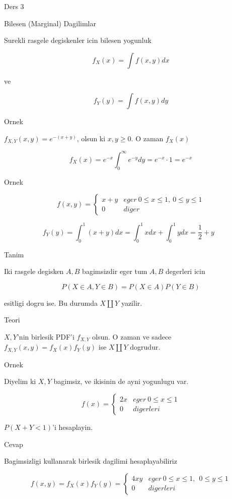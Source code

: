 \documentclass[12pt,fleqn]{article}\usepackage{../common}
\begin{document}
Ders 3

Bilesen (Marginal) Dagilimlar 

Surekli rasgele degiskenler icin bilesen yogunluk 

\[ f_X(x) = \int f(x,y) dx \]

ve

\[ f_Y(y) = \int f(x,y) dy \]

Ornek 

$f_{X,Y}(x,y) = e^{ -(x+y)}$, olsun ki $x,y \ge 0$. O zaman $f_X(x)$

\[ f_X(x) = e^{ -x} \int _{ 0}^{\infty} e^{ -y}dy = e^{ -x}  \cdot 1  = e^{-x} 
\]

Ornek 

\[ f(x,y) = 
\left\{ \begin{array}{ll}
x+y & eger \ 0 \le x \le 1, \ 0 \le y \le 1 \\
0 & diger
\end{array} \right.
 \]

\[ f_Y(y) = \int _{0}^{1}(x+y) dx = 
\int _{0}^{1}x dx + \int _{0}^{1}y dx  = 
\frac{ 1}{2} + y 
\ \ \ \label{1}
 \]

Tanim 

Iki rasgele degisken $A,B$ bagimsizdir eger tum $A,B$ degerleri icin 

\[ P(X \in A, Y \in B) = P(X \in A)P(Y \in B) \]

esitligi dogru ise. Bu durumda $X \amalg Y$ yazilir.

Teori 

$X,Y$'nin birlesik PDF'i $f_{X,Y}$ olsun. O zaman ve sadece 
$f_{X,Y}(x,y) =
 f_X(x)f_Y(y)$ ise $X \amalg Y$ dogrudur. 

Ornek 

Diyelim ki $X,Y$ bagimsiz, ve ikisinin de ayni yogunlugu var.

\[ f(x) = 
\left\{ \begin{array}{ll}
2x & eger \ 0 \le x \le 1 \\
0 & digerleri
\end{array} \right.
 \]

$P(X+Y < 1)$'i hesaplayin. 

Cevap

Bagimsizligi kullanarak birlesik dagilimi hesaplayabiliriz

\[ f(x,y) = f_X(x)f_Y(y) = 
\left\{ \begin{array}{ll}
4xy & eger \ 0 \le x \le 1, \ \ 0 \le y \le 1 \\
0 & digerleri
\end{array} \right.
 \]
\end{document}
